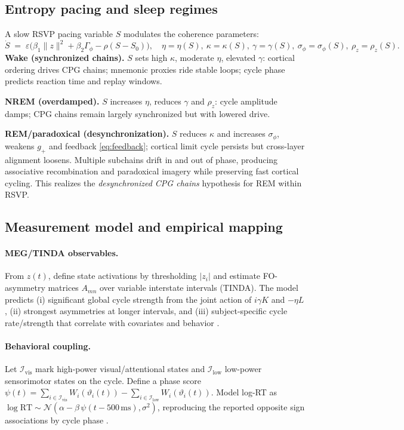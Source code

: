 \documentclass{article}
\begin{document}
\subsection{Entropy pacing and sleep regimes}
A slow RSVP pacing variable $S$ modulates the coherence parameters:
\begin{equation}
\dot S \;=\; \varepsilon\big(\beta_1\|z\|^2 + \beta_2 \Gamma_\phi - \rho(S-S_0)\big),\quad
\eta = \eta(S),\ \kappa=\kappa(S),\ \gamma=\gamma(S),\ \sigma_\phi=\sigma_\phi(S),\ \rho_z=\rho_z(S).
\label{eq:pacing}
\end{equation}
\textbf{Wake (synchronized chains).} $S$ sets high $\kappa$, moderate $\eta$, elevated $\gamma$: cortical ordering drives CPG chains; mnemonic proxies ride stable loops; cycle phase predicts reaction time and replay windows.

\textbf{NREM (overdamped).} $S$ increases $\eta$, reduces $\gamma$ and $\rho_z$: cycle amplitude damps; CPG chains remain largely synchronized but with lowered drive.

\textbf{REM/paradoxical (desynchronization).} $S$ reduces $\kappa$ and increases $\sigma_\phi$, weakens $g_+$ and feedback \eqref{eq:feedback}; cortical limit cycle persists but cross-layer alignment loosens. Multiple subchains drift in and out of phase, producing associative recombination and paradoxical imagery while preserving fast cortical cycling. This realizes the \emph{desynchronized CPG chains} hypothesis for REM within RSVP.

\subsection{Measurement model and empirical mapping}
\paragraph{MEG/TINDA observables.} From $z(t)$, define state activations by thresholding $|z_i|$ and estimate FO-asymmetry matrices $A_{mn}$ over variable interstate intervals (TINDA). The model predicts (i) significant global cycle strength from the joint action of $i\gamma K$ and $-\eta L$, (ii) strongest asymmetries at longer intervals, and (iii) subject-specific cycle rate/strength that correlate with covariates and behavior \citep{van2025cortical}.

\paragraph{Behavioral coupling.} Let $\mathcal{I}_{\text{vis}}$ mark high-power visual/attentional states and $\mathcal{I}_{\text{low}}$ low-power sensorimotor states on the cycle. Define a phase score $\psi(t)=\sum_{i\in\mathcal{I}_{\text{vis}}}\!W_i(\vartheta_i(t))- \sum_{i\in\mathcal{I}_{\text{low}}}\!W_i(\vartheta_i(t))$. Model log-RT as $\log \mathrm{RT} \sim \mathcal{N}(\alpha - \beta\,\psi(t-500\,\mathrm{ms}),\sigma^2)$, reproducing the reported opposite sign associations by cycle phase \citep{van2025cortical}.
\end{document}
